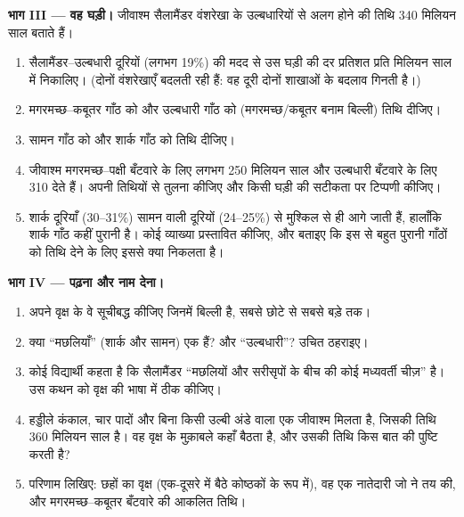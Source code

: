 \begin{problem}
\medskip
\noindent\textbf{भाग III --- वह घड़ी।}
जीवाश्म सैलामैंडर वंशरेखा के उल्बधारियों से अलग होने की तिथि 340 मिलियन साल
बताते हैं।
\begin{enumerate}[resume]
  \item सैलामैंडर--उल्बधारी दूरियों (लगभग 19\%) की मदद से उस घड़ी की दर
        प्रतिशत प्रति मिलियन साल में निकालिए। (दोनों वंशरेखाएँ बदलती रही हैं:
        वह दूरी दोनों शाखाओं के बदलाव गिनती है।)
  \item मगरमच्छ--कबूतर गाँठ को और उल्बधारी गाँठ को (मगरमच्छ/कबूतर बनाम
        बिल्ली) तिथि दीजिए।
  \item सामन गाँठ को और शार्क गाँठ को तिथि दीजिए।
  \item जीवाश्म मगरमच्छ--पक्षी बँटवारे के लिए लगभग 250 मिलियन साल और
        उल्बधारी बँटवारे के लिए 310 देते हैं। अपनी तिथियों से तुलना कीजिए
        और किसी  घड़ी की सटीकता पर टिप्पणी कीजिए।
  \item शार्क दूरियाँ (30--31\%) सामन वाली दूरियों (24--25\%) से मुश्किल
        से ही आगे जाती हैं, हालाँकि शार्क गाँठ कहीं पुरानी है। कोई
        व्याख्या प्रस्तावित कीजिए, और बताइए कि इस  से बहुत पुरानी
        गाँठों को तिथि देने के लिए इससे क्या निकलता है।
\end{enumerate}

\medskip
\noindent\textbf{भाग IV --- पढ़ना और नाम देना।}
\begin{enumerate}[resume]
  \item अपने वृक्ष के वे  सूचीबद्ध कीजिए जिनमें बिल्ली है, सबसे छोटे
        से सबसे बड़े तक।
  \item क्या ``मछलियाँ'' (शार्क और सामन) एक  हैं? और ``उल्बधारी''?
        उचित ठहराइए।
  \item कोई विद्यार्थी कहता है कि सैलामैंडर ``मछलियों और सरीसृपों के बीच
        की कोई मध्यवर्ती चीज़'' है। उस कथन को वृक्ष की भाषा में ठीक कीजिए।
  \item हड्डीले कंकाल, चार पादों और बिना किसी उल्बी अंडे वाला एक जीवाश्म
        मिलता है, जिसकी तिथि 360 मिलियन साल है। वह वृक्ष के मुक़ाबले कहाँ
        बैठता है, और उसकी तिथि किस बात की पुष्टि करती है?
  \item परिणाम लिखिए: छहों  का वृक्ष (एक-दूसरे में बैठे कोष्ठकों के
        रूप में), वह एक नातेदारी जो  ने तय की, और मगरमच्छ--कबूतर
        बँटवारे की आकलित तिथि।
\end{enumerate}
\end{problem}
